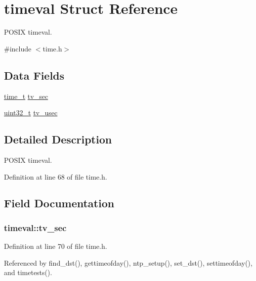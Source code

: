 \hypertarget{structtimeval}{}\section{timeval Struct Reference}
\label{structtimeval}


P\+O\+S\+IX timeval.  




{\ttfamily \#include $<$time.\+h$>$}

\subsection*{Data Fields}
\begin{DoxyCompactItemize}
\item 
\hyperlink{time_8h_a3346b04b0420b32ccf6b706551b70762}{time\+\_\+t} \hyperlink{structtimeval_aef6ddab1064c430758f9f913b7e4a21e}{tv\+\_\+sec}
\item 
\hyperlink{send_8c_a435d1572bf3f880d55459d9805097f62}{uint32\+\_\+t} \hyperlink{structtimeval_a8fd7abf5420981b3ff58bb23df458587}{tv\+\_\+usec}
\end{DoxyCompactItemize}


\subsection{Detailed Description}
P\+O\+S\+IX timeval. 

Definition at line 68 of file time.\+h.



\subsection{Field Documentation}
\subsubsection[{\texorpdfstring{tv\+\_\+sec}{tv_sec}}]{ timeval\+::tv\+\_\+sec}\hypertarget{structtimeval_aef6ddab1064c430758f9f913b7e4a21e}{}\label{structtimeval_aef6ddab1064c430758f9f913b7e4a21e}


Definition at line 70 of file time.\+h.



Referenced by find\+\_\+dst(), gettimeofday(), ntp\+\_\+setup(), set\+\_\+dst(), settimeofday(), and timetests().

